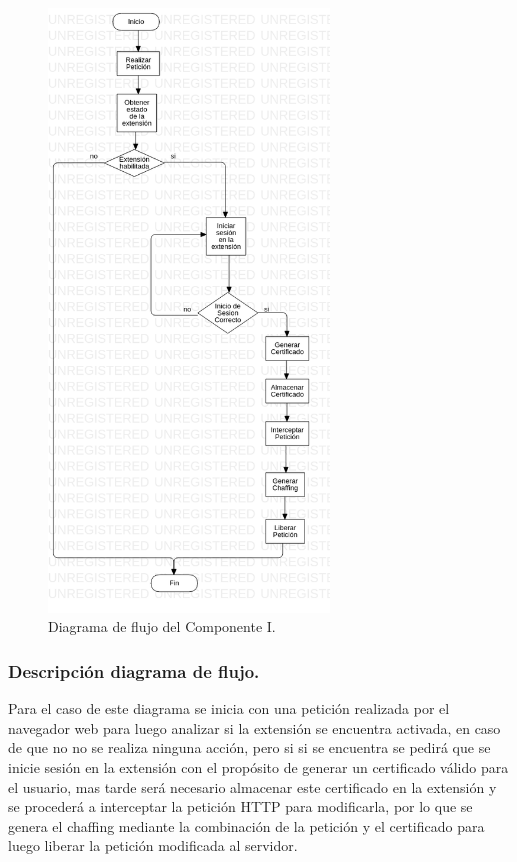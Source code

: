 \documentclass[12pt, a4paper, titlepage]{report}
\begin{document}
			    \begin{figure}[H]
					\begin{center}			    	\includegraphics[height=16cm]{./imagenes/Disenio/Componente_1/CI_DF_P1.png}
						\caption{Diagrama de flujo del Componente I.}
					\end{center}
				\end{figure}
				
			    \subsubsection{Descripción diagrama de flujo.}
			        Para el caso de este diagrama se inicia con una petición realizada por el navegador web para luego analizar si la extensión se encuentra activada, en caso de que no no se realiza ninguna acción, pero si si se encuentra se pedirá que se inicie sesión en la extensión con el propósito de generar un certificado válido para el usuario, mas tarde será necesario almacenar este certificado en la extensión y se procederá a interceptar la petición HTTP para modificarla, por lo que se genera el chaffing mediante la combinación de la petición y el certificado para luego liberar la petición modificada al servidor.
				
\end{document}
